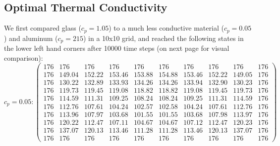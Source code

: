 \documentclass[12pt]{reedmcm}
\begin{document}
\subsection{Optimal Thermal Conductivity}
We first compared glass ($c_p = 1.05$) to a much less conductive material ($c_p = 0.05$) and aluminum ($c_p = 215$) in a 10x10 grid, and reached the following states in the lower left hand corners after 10000 time steps (on next page for visual comparison):\newpage
\[c_p = 0.05: \begin{pmatrix} 176&176&176&176&176&176&176&176&176&176\\
176&149.04&152.22&153.46&153.88&154.88&153.46&152.22&149.05&176\\
176&130.22&132.89&133.93&134.26&134.26&133.94&132.90&130.23&176\\
176&119.73&119.45&119.08&118.82&118.82&119.08&119.45&119.73&176\\
176&114.59&111.31&109.25&108.24&108.24&109.25&111.31&114.59&176\\
176&112.76&107.61&104.24&102.57&102.58&104.24&107.61&112.76&176\\
176&113.96&107.97&103.68&101.55&101.55&103.68&107.98&113.97&176\\
176&120.22&112.47&107.11&104.67&104.67&107.12&112.47&120.23&176\\
176&137.07&120.13&113.46&111.28&111.28&113.46&120.13&137.07&176\\
176&176&176&176&176&176&176&176&176&176\end{pmatrix}\]
\end{document}
